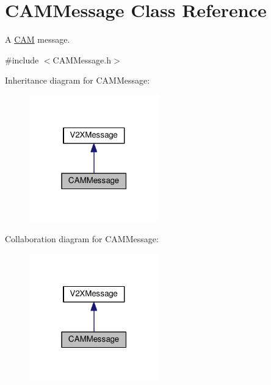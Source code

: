\hypertarget{classCAMMessage}{}\section{C\+A\+M\+Message Class Reference}
\label{classCAMMessage}


A \hyperlink{structCAM}{C\+AM} message.  




{\ttfamily \#include $<$C\+A\+M\+Message.\+h$>$}



Inheritance diagram for C\+A\+M\+Message\+:\nopagebreak
\begin{figure}[H]
\begin{center}
\leavevmode
\includegraphics[width=159pt]{classCAMMessage__inherit__graph}
\end{center}
\end{figure}


Collaboration diagram for C\+A\+M\+Message\+:\nopagebreak
\begin{figure}[H]
\begin{center}
\leavevmode
\includegraphics[width=159pt]{classCAMMessage__coll__graph}
\end{center}
\end{figure}
